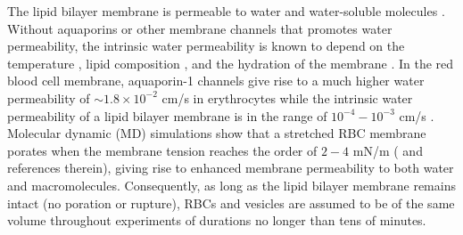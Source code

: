 \documentclass[9pt,twocolumn,twoside,lineno]{pnas-new}
\begin{document}
The lipid bilayer membrane is permeable to water and water-soluble molecules \cite{Dick1964_JTB,FettiplaceHaydon1980_PhysRev,DeamerBramhall1986_ChemPhysLipids,Grafmueller2019_ABLS}. 
%
%
Without aquaporins or other membrane channels that promotes water permeability, the intrinsic water permeability is known to depend on the temperature \cite{OlbrichRawiczNeedhamEtAl2000_BJ}, lipid composition \cite{OlbrichRawiczNeedhamEtAl2000_BJ}, and the hydration of the membrane \cite{MarrinkBerendsen1994_JPhysChem}. In the red blood cell membrane, aquaporin-1 channels give rise to a much higher water permeability of $\sim 1.8\times 10^{-2}$ cm/s in erythrocytes \cite{YangMaVerkman2001_JBC} while the intrinsic water permeability of a lipid bilayer membrane is in the range of $10^{-4}-10^{-3}$ cm/s \cite{ThompsonHuang1966_ANYAS,FettiplaceHaydon1980_PhysRev,Grafmueller2019_ABLS,Dimova2020_GVB,BhatiaRobinsonDimova2020_SoftMatt}. 
%
Molecular dynamic (MD) 
simulations show that a stretched RBC membrane porates when the membrane tension reaches the order of $2-4$ mN/m (\cite{RazizadehNikfarPaulLiu2020_BJ} and references therein), giving rise to enhanced membrane permeability to both water and macromolecules. Consequently, as long as the lipid bilayer membrane remains intact (no poration or rupture), RBCs and vesicles are assumed to be of the same volume throughout experiments of durations no longer than tens of minutes. 
%
\end{document}
